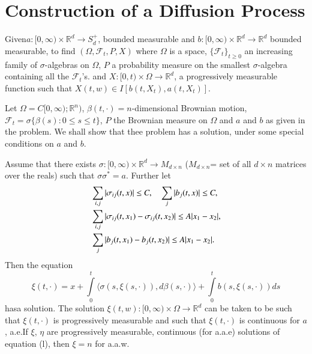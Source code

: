 \chapter{Construction of a Diffusion Process}\label{chap25}

\begin{problem*}
Given\pageoriginale $a:[0,\infty)\times \mathbb{R}^{d}\to S^{+}_{d}$,
  bounded measurable and $b:[0,\infty)\times \mathbb{R}^{d}\to
    \mathbb{R}^{d}$ bounded measurable, to find
    $(\Omega,\mathscr{F}_{t},P,X)$ where $\Omega$ is a space,
    $\{\mathscr{F}_{t}\}_{t\geq 0}$ an increasing family of
    $\sigma$-algebras on $\Omega$, $P$ a probability measure on the
    smallest $\sigma$-algebra containing all the
    $\mathscr{F}_{t}$'s. and $X:[0,t)\times \Omega\to \mathbb{R}^{d}$,
      a progressively measurable function such that $X(t,w)\in
      I[b(t,X_{t}),a(t,X_{t})]$. 
\end{problem*}

Let $\Omega=C[0,\infty);\mathbb{R}^{n})$,
  $\beta(t,\cdot)=n$-dimensional Brownian motion,
  $\mathscr{F}_{t}=\sigma\{\beta(s):0\leq s\leq t\}$, $P$ the Brownian
  measure on $\Omega$ and $a$ and $b$ as given in the problem. We
  shall show that thee problem has a solution, under some special
  conditions on $a$ and $b$.

\begin{theorem*}
Assume that there exists $\sigma:[0,\infty)\times \mathbb{R}^{d}\to
  M_{d\times n}$ ($M_{d\times n}$= set of all $d\times n$ matrices
  over the reals) such that $\sigma\sigma^{*}=a$. Further let
\begin{align*}
& \sum_{i,j}|\sigma_{ij}(t,x)|\leq C,\quad \sum_{j}|b_{j}(t,x)|\leq C,\\
& \sum_{i,j}|\sigma_{ij}(t,x_{1})-\sigma_{ij}(t,x_{2})|\leq
  A|x_{1}-x_{2}|,\\
& \sum_{j}|b_{j}(t,x_{1})-b_{j}(t,x_{2})|\leq A|x_{1}-x_{2}|.
\end{align*}
Then the equation
\begin{equation*}
\xi(t,\cdot)=x+\int\limits^{t}_{0}\langle
  \sigma(s,\xi(s,\cdot)), d\beta(s,\cdot)\rangle
  +\int\limits^{t}_{0}b(s,\xi(s,\cdot))ds\tag{1}
\end{equation*}
has\pageoriginale a solution. The solution $\xi(t,w):[0,\infty)\times
  \Omega\to \mathbb{R}^{d}$ can be taken to be such that
  $\xi(t,\cdot)$ is progressively measurable and such that
  $\xi(t,\cdot)$ is continuous for $a$, a.e.\@ If $\xi$, $\eta$ are
  progressively measurable, continuous (for a.a.e) solutions of
  equation (l), then $\xi=n$ for a.a.w.
\end{theorem*}

